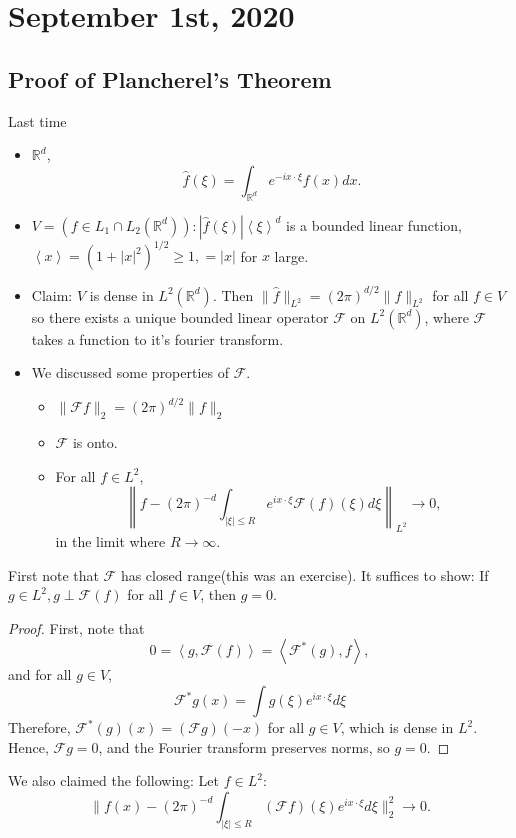 \documentclass[11pt]{scrartcl}
\newcommand{\R}{\mathbb{R}}
\let \hat \widehat
\newcommand{\<}{\langle}
\renewcommand{\>}{\rangle}
\begin{document}
\section{September 1st, 2020}
\subsection{Proof of Plancherel's Theorem}
Last time
\begin{itemize}
\item $\R^d$, $$\hat{f}(\xi) = \int_{\R^d} e^{-ix \cdot \xi} f(x)dx.$$
\item $V = (f \in L_1 \cap L_2(\R^d)) : |\hat{f}(\xi)|\left <\xi \right >^d$ is a bounded linear function, $\left< x\right > = (1 + |x|^2)^{1/2} \ge 1, = |x|$ for $x$ large.
\item Claim: $V$ is dense in $L^2(\R^d)$.  Then $\|\hat{f}\|_{L^2} = (2\pi)^{d/2}\|f\|_{L^2}$ for all $f \in V$ so there exists a unique bounded linear operator $\mathscr{F}$ on $L^2(\R^d)$, where $\mathscr{F}$ takes a function to it's fourier transform.
\item We discussed some properties of $\mathscr{F}$.
\begin{itemize}
\item $\|\mathscr{F}f\|_2 = (2\pi)^{d/2} \|f\|_2$
\item $\mathscr{F}$ is onto.
\item For all $f \in L^2$, $$\left\|f - (2\pi )^{-d} \int_{|\xi| \le R}e^{ix \cdot \xi}\mathscr{F}(f)(\xi) d\xi \right \|_{L^2}\rightarrow 0,$$
in the limit where $R \rightarrow \infty$.
\end{itemize}
\end{itemize}
First note that $\mathscr{F}$ has closed range(this was an exercise).  It suffices to show: If $g \in L^2, g \perp \mathscr{F}(f) $ for all $f \in V$, then $g = 0$.
\begin{proof} First, note that 
$$0 = \left <g, \mathscr{F}(f)\right >= \left <\mathscr{F}^*(g),f\right >,$$ 
and for all $g \in V$, $$\mathscr{F}^*g(x) = \int g(\xi)e^{ix \cdot \xi}d\xi$$
Therefore, $\mathscr{F}^*(g)(x) = (\mathscr{F}g)(-x)$ for all $g \in V$, which is dense in $L^2$.  Hence, $\mathscr{F}g = 0$, and the Fourier transform preserves norms, so $g = 0$.
\end{proof}
We also claimed the following:
Let $f \in L^2$:
$$\|f(x) - (2\pi)^{-d}\int_{|\xi| \le R} (\mathscr{F}f)(\xi)e^{ix\cdot \xi}d\xi\|_2^2 \rightarrow 0.$$
\end{document}
